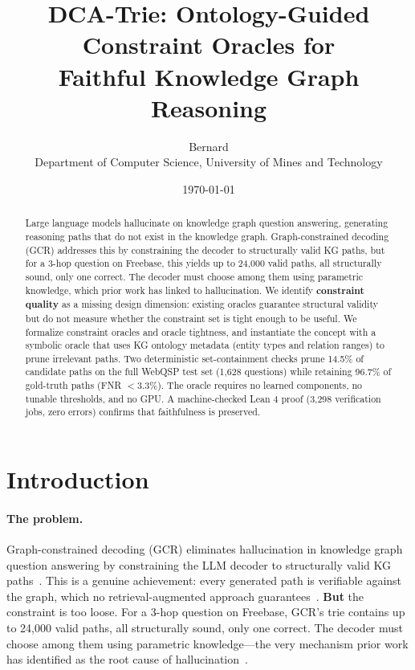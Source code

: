 \documentclass[11pt,twoside]{article}
\title{DCA-Trie: Ontology-Guided Constraint Oracles for \\ Faithful Knowledge Graph Reasoning}
\author{Bernard\\[4pt]
\small Department of Computer Science, University of Mines and Technology}
\date{\today}
\begin{document}
\maketitle

\begin{abstract}
	Large language models hallucinate on knowledge graph question answering, generating reasoning paths that do not exist in the knowledge graph. Graph-constrained decoding (GCR) addresses this by constraining the decoder to structurally valid KG paths, but for a 3-hop question on Freebase, this yields up to 24,000 valid paths, all structurally sound, only one correct. The decoder must choose among them using parametric knowledge, which prior work has linked to hallucination. We identify \textbf{constraint quality} as a missing design dimension: existing oracles guarantee structural validity but do not measure whether the constraint set is tight enough to be useful. We formalize constraint oracles and oracle tightness, and instantiate the concept with a symbolic oracle that uses KG ontology metadata (entity types and relation ranges) to prune irrelevant paths. Two deterministic set-containment checks prune 14.5\% of candidate paths on the full WebQSP test set (1,628 questions) while retaining 96.7\% of gold-truth paths (FNR $< 3.3\%$). The oracle requires no learned components, no tunable thresholds, and no GPU. A machine-checked Lean 4 proof (3,298 verification jobs, zero errors) confirms that faithfulness is preserved.
\end{abstract}

\section{Introduction}
\label{sec:introduction}

\paragraph{The problem.} Graph-constrained decoding (GCR) eliminates hallucination in knowledge graph question answering by constraining the LLM decoder to structurally valid KG paths~\citep{luo2025-graph-constrained-reasoning,li2024-decoding-on-graphs}. This is a genuine achievement: every generated path is verifiable against the graph, which no retrieval-augmented approach guarantees~\citep{lewis2020rag,he2021multihop}. \textbf{But} the constraint is too loose. For a 3-hop question on Freebase, GCR's trie contains up to 24,000 valid paths, all structurally sound, only one correct. The decoder must choose among them using parametric knowledge---the very mechanism prior work has identified as the root cause of hallucination~\citep{huang2023hallucination,ji2023survey}.
\end{document}
